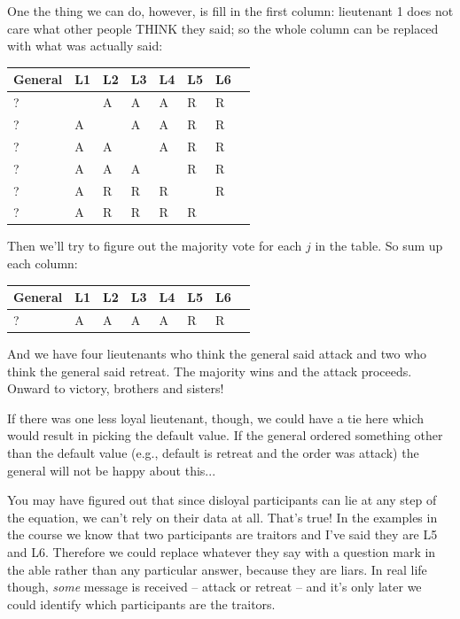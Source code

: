 \documentclass[a4paper]{report}
\begin{document}
One the thing we can do, however, is fill in the first column: lieutenant 1 does not care what other people THINK they said; so the whole column can be replaced with what was actually said:

\begin{center}
	\begin{tabular}{|l|l|l|l|l|l|l|l|}
		\hline
		General & L1 & L2 & L3 & L4 & L5 & L6 \\
		\hline
		?       & ~  & A  & A  & A  & R  & R  \\ \hline
		?       & A  & ~  & A  & A  & R  & R  \\ \hline
		?       & A  & A  & ~  & A  & R  & R  \\ \hline
		?       & A  & A  & A  & ~  & R  & R  \\ \hline
		?       & A  & R  & R  & R  & ~  & R  \\ \hline
		?       & A  & R  & R  & R  & R  & ~  \\ \hline
	\end{tabular}
\end{center}

Then we'll try to figure out the majority vote for each $j$ in the table. So sum up each column:

\begin{center}
	\begin{tabular}{|l|l|l|l|l|l|l|l|}
		\hline
		General & L1 & L2 & L3 & L4 & L5 & L6 \\
		\hline
		?       & A  & A  & A  & A  & R  & R  \\
		\hline
	\end{tabular}
\end{center}

And we have four lieutenants who think the general said attack and two who think the general said retreat. The majority wins and the attack proceeds. Onward to victory, brothers and sisters!

If there was one less loyal lieutenant, though, we could have a tie here which would result in picking the default value. If the general ordered something other than the default value (e.g., default is retreat and the order was attack) the general will not be happy about this...

You may have figured out that since disloyal participants can lie at any step of the equation, we can't rely on their data at all. That's true! In the examples in the course we know that two participants are traitors and I've said they are L5 and L6. Therefore we could replace whatever they say with a question mark in the able rather than any particular answer, because they are liars. In real life though, \textit{some} message is received -- attack or retreat -- and it's only later we could identify which participants are the traitors.
\end{document}
